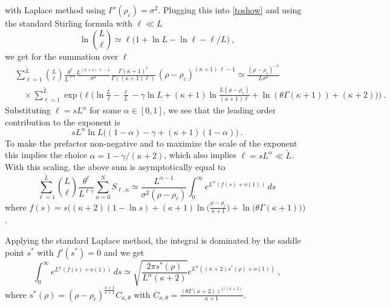 \documentclass[pdflatex,sn-mathphys-num]{sn-jnl}%
\theoremstyle{thmstyleone}%
\theoremstyle{thmstyletwo}%
\theoremstyle{thmstylethree}%
\begin{document}
with Laplace method using $I''(\rho_c )=\sigma^2$. Plugging this into \eqref{toshow} and using the standard Stirling formula with $\ell\ll L$
\[
\ln {L\choose\ell} \simeq \ell \Big( 1+\ln L-\ln\ell -\ell /L\Big)\ ,
\]
we get for the summation over $\ell$ \begin{align*}
    &\sum_{\ell =1}^{\tilde L} {L\choose\ell} \frac{\theta^\ell}{L^{\ell\gamma}} \frac{L^{(\kappa +1)\,\ell-1}}{\sigma^2} \frac{\Gamma(\kappa +1)^\ell}{\Gamma((\kappa +1)\ell )}\, (\rho -\rho_c )^{(\kappa +1)\,\ell-1} \simeq\frac{(\rho -\rho_c )^{-1}}{L\sigma^2}\\
    &\quad\times\sum_{\ell =1}^{\tilde L} \exp\bigg(\ell\Big( \ln\frac{L}{\ell} {-}\frac{\ell}{L} {-}\gamma\ln L{+}(\kappa {+}1)\ln \frac{L(\rho {-}\rho_c)}{(\kappa {+}1)\ell}+\ln (\theta\Gamma (\kappa {+}1))+(\kappa {+}2)\Big)\bigg)\ .
\end{align*}
Substituting $\ell =sL^\alpha$ for some $\alpha\in [0,1]$, we see that the leading order contribution to the exponent is
\[
sL^\alpha \ln L\Big( (1-\alpha )-\gamma +(\kappa +1)(1-\alpha )\Big)\ .
\]
To make the prefactor non-negative and to maximize the scale of the exponent this implies the choice $\alpha = 1-\gamma /(\kappa +2)$, which also implies $\ell =sL^\alpha \ll\tilde L$. With this scaling, the above sum is asymptotically equal to
\[
    \sum_{\ell =1}^{\tilde L} {L\choose\ell} \frac{\theta^\ell}{L^{\ell\gamma}} \sum_{n=0}^N S_{\ell ,n} 
    \simeq\frac{L^{\alpha -1}}{\sigma^2 (\rho -\rho_c )} \int_0^\infty e^{L^\alpha (f(s)+o(1))}\, ds\ 
\]
where $f(s) =s\Big( (\kappa +2)(1-\ln s)+(\kappa+1)\ln\big(\frac{\rho -\rho_c}{\kappa +1}\big)+\ln \big(\theta\Gamma (\kappa +1)\big) \Big)\ $.

Applying the standard Laplace method, the integral is dominated by the saddle point $s^*$ with $f'(s^* )=0$ and we get
\[    
\int_0^\infty e^{L^\alpha (f(s)+o(1))}\, ds\simeq \sqrt{\frac{2\pi s^* (\rho )}{L^\alpha (\kappa +2)}} e^{L^\alpha ((\kappa +2) s^* (\rho ) +o(1))}\ ,
\]
where 
$s^* (\rho ) =(\rho -\rho_c)^{\frac{\kappa +1}{\kappa +2}} C_{\kappa ,\theta}$ with $C_{\kappa ,\theta} =\frac{(\theta\Gamma (\kappa +2))^{1/(\kappa +2)}}{\kappa +1}$.
\end{document}
